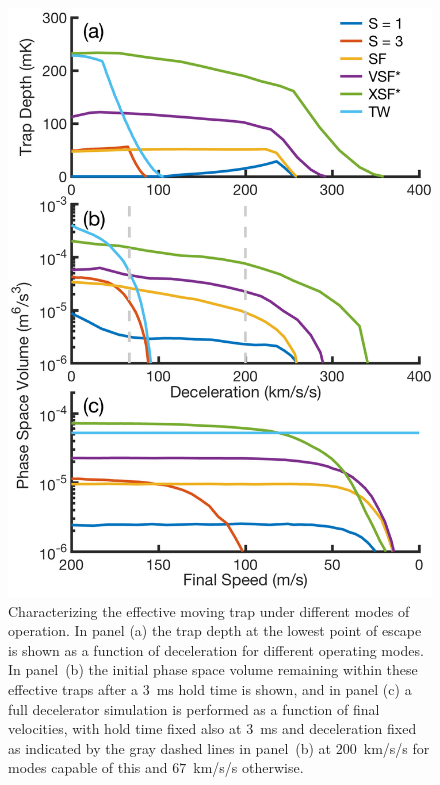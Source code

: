 \documentclass[%
 reprint,
 amsmath,amssymb,
 aps,
prl,
]{revtex4-1}
\begin{document}
\begin{figure}[t]
\includegraphics[width=\linewidth]{full-three-panel.png}%
\caption{
Characterizing the effective moving trap under different modes of operation. In panel (a) the trap depth at the lowest point of escape is shown as a function of deceleration for different operating modes. In panel~(b) the initial phase space volume remaining within these effective traps after a $3$~ms hold time is shown, and in panel (c) a full decelerator simulation is performed as a function of final velocities, with hold time fixed also at $3$~ms and deceleration fixed as indicated by the gray dashed lines in panel~(b) at $200$~km/s/s for modes capable of this and $67$~km/s/s otherwise.}
\label{fig:efftrap}
\end{figure}
\end{document}
